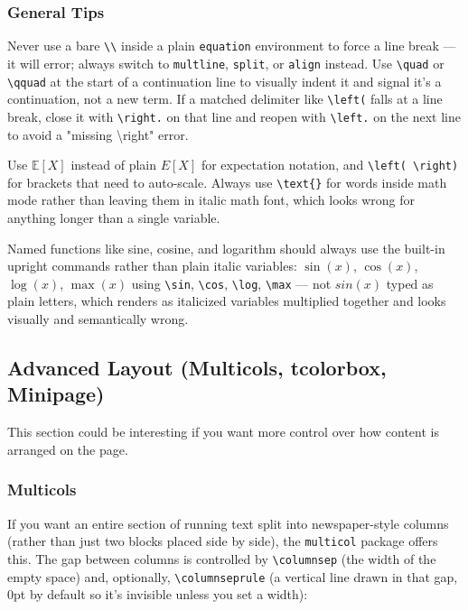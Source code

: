 \subsubsection*{General Tips}

Never use a bare \verb|\\| inside a plain \verb|equation| environment to force a line break --- it will error; always switch to \verb|multline|, \verb|split|, or \verb|align| instead. Use \verb|\quad| or \verb|\qquad| at the start of a continuation line to visually indent it and signal it's a continuation, not a new term. If a matched delimiter like \verb|\left(| falls at a line break, close it with \verb|\right.| on that line and reopen with \verb|\left.| on the next line to avoid a "missing \textbackslash right" error.

Use \(\mathbb{E}[X]\) instead of plain \(E[X]\) for expectation notation, and \verb|\left( \right)| for brackets that need to auto-scale. Always use \verb|\text{}| for words inside math mode rather than leaving them in italic math font, which looks wrong for anything longer than a single variable.

Named functions like sine, cosine, and logarithm should always use the built-in upright commands rather than plain italic variables: \(\sin(x)\), \(\cos(x)\), \(\log(x)\), \(\max(x)\) using \verb|\sin|, \verb|\cos|, \verb|\log|, \verb|\max| --- not \(sin(x)\) typed as plain letters, which renders as italicized variables multiplied together and looks visually and semantically wrong.

\subsection*{Advanced Layout (Multicols, tcolorbox, Minipage)}
This section could be interesting if you want more control over how content is arranged on the page.

\subsubsection*{Multicols}
If you want an entire section of running text split into newspaper-style columns (rather than just two blocks placed side by side), the \texttt{multicol} package offers this. The gap between columns is controlled by \verb|\columnsep| (the width of the empty space) and, optionally, \verb|\columnseprule| (a vertical line drawn in that gap, 0pt by default so it's invisible unless you set a width):

\setlength{\columnsep}{30pt}
\setlength{\columnseprule}{0pt}

